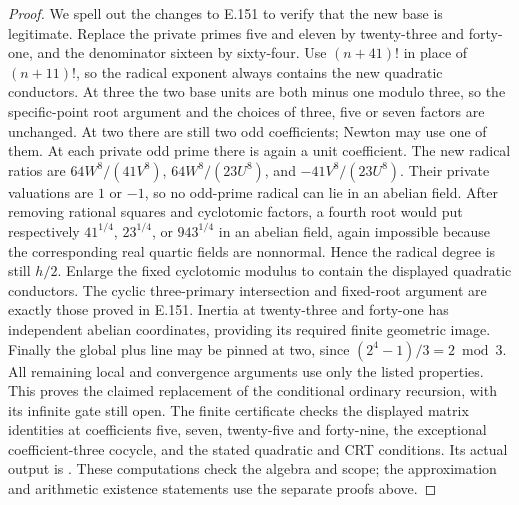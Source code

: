 \begin{proof}
We spell out the changes to E.151 to verify that the new base
is legitimate. Replace the private primes five and eleven by
twenty-three and forty-one, and the denominator sixteen by
sixty-four. Use \((n+41)!\) in place of \((n+11)!\), so
the radical exponent always contains the new quadratic conductors.
At three the two base units are both minus one
modulo three, so the specific-point root argument and the
choices of three, five or seven factors are unchanged.
At two there are still two odd coefficients; Newton may use
one of them. At each private odd prime there is again a unit
coefficient. The new radical ratios are
\(64W^8/(41V^8)\), \(64W^8/(23U^8)\), and
\(-41V^8/(23U^8)\). Their private valuations are \(1\) or
\(-1\), so no odd-prime radical can lie in an abelian field.
After removing rational squares and cyclotomic factors, a
fourth root would put respectively
\(41^{1/4}\), \(23^{1/4}\), or \(943^{1/4}\) in an
abelian field, again impossible because the corresponding
real quartic fields are nonnormal. Hence the radical degree
is still \(h/2\). Enlarge the fixed cyclotomic modulus to
contain the displayed quadratic conductors. The cyclic
three-primary intersection and fixed-root argument are exactly
those proved in E.151. Inertia at twenty-three and forty-one
has independent abelian coordinates, providing its required
finite geometric image. Finally the global plus line may be
pinned at two, since \((2^4-1)/3=2\bmod3\).
All remaining local and convergence arguments use only the
listed properties. This proves the claimed replacement of
the conditional ordinary recursion, with its infinite gate
still open.
The finite certificate 
checks the displayed matrix identities at coefficients five, seven,
twenty-five and forty-nine, the exceptional coefficient-three cocycle,
and the stated quadratic and CRT conditions. Its actual output is
. These computations
check the algebra and scope; the approximation and arithmetic existence
statements use the separate proofs above.
\end{proof}
